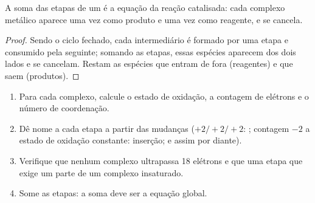 \begin{proposition}\label{prop:b2:catalytic-cycles:cycle-sum}
A soma das etapas de um  é a equação da reação catalisada:
cada complexo metálico aparece uma vez como produto e uma vez como reagente, e
se cancela.
\end{proposition}

\begin{proof}
Sendo o ciclo fechado, cada intermediário é formado por uma etapa e consumido
pela seguinte; somando as etapas, essas espécies aparecem dos dois lados e se
cancelam. Restam as espécies que entram de fora (reagentes) e que saem
(produtos).
\end{proof}

\begin{method}\label{met:b2:catalytic-cycles:read-cycle}
\begin{enumerate}
  \item Para cada complexo, calcule o estado de oxidação, a contagem de
        elétrons e o número de coordenação.
  \item Dê nome a cada etapa a partir das mudanças ($+2/+2/+2$: ; contagem $-2$ a estado de oxidação constante: inserção; e
        assim por diante).
  \item Verifique que nenhum complexo ultrapassa 18 elétrons e que uma etapa
        que exige um  parte de um complexo insaturado.
  \item Some as etapas: a soma deve ser a equação global.
\end{enumerate}
\end{method}

